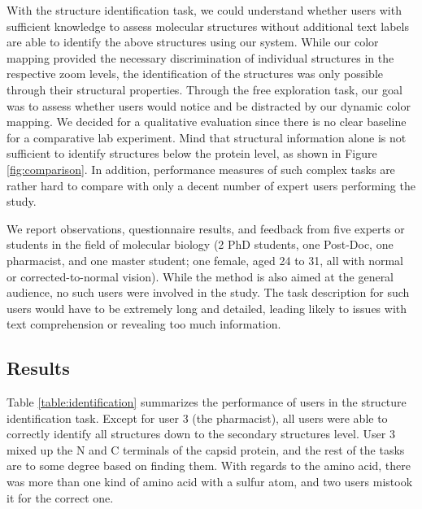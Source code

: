 \documentclass{egpubl}
\begin{document}
	With the structure identification task, we could understand whether users with sufficient knowledge to assess molecular structures without additional text labels are able to identify the above structures using our system. 
	While our color mapping provided the necessary discrimination of individual structures in the respective zoom levels, the identification of the structures was only possible through their structural properties.
	Through the free exploration task, our goal was to assess whether users would notice and be distracted by our dynamic color mapping. 
	We decided for a qualitative evaluation since there is no clear baseline for a comparative lab experiment. 
	Mind that structural information alone is not sufficient to identify structures below the protein level, as shown in Figure \ref{fig:comparison}. 
	In addition, performance measures of such complex tasks are rather hard to compare with only a decent number of expert users performing the study. 
	
	
	We  report observations, questionnaire results, and feedback from five experts or students in the field of molecular biology (2 PhD students, one Post-Doc, one pharmacist, and one master student; one female, aged 24 to 31, all with normal or corrected-to-normal vision). 
	While the method is also aimed at the general audience, no such users were involved in the study. 
	The task description for such users would have to be extremely long and detailed, leading likely to issues with text comprehension or revealing too much information. 
	
	\subsection{Results}
	
	Table \ref{table:identification} summarizes the performance of users in the structure identification task. 
	Except for user 3 (the pharmacist), all users were able to correctly identify all structures down to the secondary structures level. 
	User 3 mixed up the N and C terminals of the capsid protein, and the rest of the tasks are to some degree based on finding them.
	With regards to the amino acid, there was more than one kind of amino acid with a sulfur atom, and two users mistook it for the correct one.
	
\end{document}
